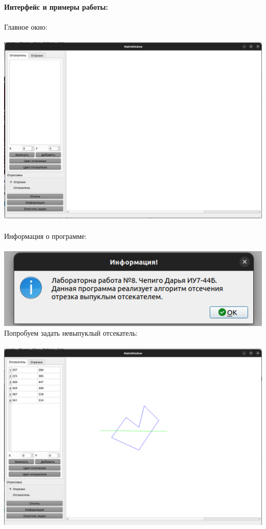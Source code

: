 \documentclass[a4paper,12pt]{article}
\begin{document}
	
	\newpage
	\noindent\textbf{Интерфейс и примеры работы:}\\\\
	Главное окно:\\\\
	\includegraphics[width=\linewidth]{mainwindow}\\\\
	Информация о программе:\\\\
	\includegraphics[width=\linewidth]{infor}
	\newpage
	\noindent Попробуем задать невыпуклый отсекатель:\\\\
	\includegraphics[width=\linewidth]{errorpol}\\\\
\end{document}
